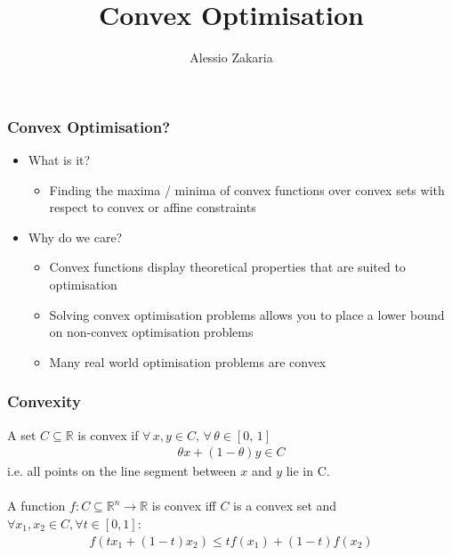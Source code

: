 \documentclass{beamer}
\title{Convex Optimisation}
\author{Alessio Zakaria}
\date{}
\def\rnum{\mathbb{R}}
\begin{document}
\begin{frame}
    \titlepage
\end{frame}

\begin{frame}
    \frametitle{Convex Optimisation?}
    \begin{itemize}
    \item What is it?
        \begin{itemize}
        \item Finding the maxima / minima of convex functions over convex sets
        with respect to convex or affine constraints
        \end{itemize}
    \item Why do we care?
        \begin{itemize}
            \item Convex functions display theoretical properties that are
                suited to optimisation
            \item Solving convex optimisation problems allows you to place a lower bound
                on non-convex optimisation problems
            \item Many real world optimisation problems are convex
        \end{itemize}
    \end{itemize}
\end{frame}
\begin{frame}
    \frametitle{Convexity}
    A set $C \subseteq \mathbb{R}$ is convex if $\forall \,  x,  y \in C, \,
    \forall \, \theta \in [0, \, 1]$
    \begin{align*}
        \theta x + (1-\theta)y \in C
    \end{align*}
    i.e. all points on the line segment between $x$ and $y$ lie in C.
    \\~\\
    A function $f : C \subseteq \rnum^{n} \rightarrow \rnum$ is convex iff $C$
    is a convex set and $\forall x_{1}, x_{2} \in C, \forall t \in [0,1]$:
    \begin{align*}
        f(t x_{1} + (1-t)x_{2}) \leq t f(x_{1}) + (1-t)f(x_{2})
    \end{align*}
\end{frame}
\end{document}

